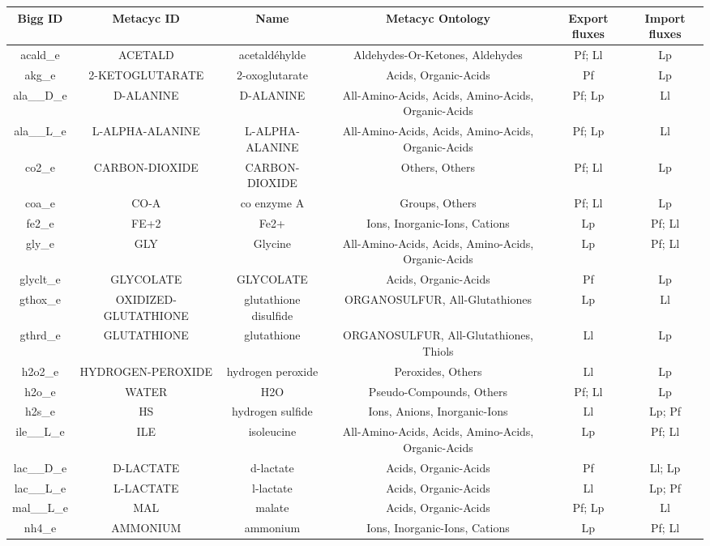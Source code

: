 \documentclass[../main.tex]{subfiles}
\begin{document}
\begin{table}[H]
\centering
\begin{adjustbox}{width=1.2\textwidth}
\begin{tabular}{|c|c|c|c|c|c|}
\hline
Bigg ID & Metacyc ID & Name & Metacyc Ontology & Export fluxes & Import fluxes\\
\hline
acald\_e	& ACETALD &	acetaldéhylde & Aldehydes-Or-Ketones, Aldehydes	& Pf; Ll &	Lp \\
akg\_e &	2-KETOGLUTARATE	& 2-oxoglutarate &	Acids, Organic-Acids	& Pf &	Lp \\
ala\_\_D\_e &	D-ALANINE &	D-ALANINE &	All-Amino-Acids, Acids, Amino-Acids, Organic-Acids	& Pf; Lp &	Ll \\
ala\_\_L\_e	& L-ALPHA-ALANINE &	L-ALPHA-ALANINE &	All-Amino-Acids, Acids, Amino-Acids, Organic-Acids	& Pf; Lp	& Ll \\
co2\_e &	CARBON-DIOXIDE	& CARBON-DIOXIDE	& Others, Others	& Pf; Ll &	Lp \\
coa\_e &	CO-A &	co enzyme A &	Groups, Others	& Pf; Ll	& Lp \\
fe2\_e	& FE+2	& Fe2+&	Ions, Inorganic-Ions, Cations &	Lp	& Pf; Ll \\
gly\_e	& GLY	& Glycine	& All-Amino-Acids, Acids, Amino-Acids, Organic-Acids &	Lp &	Pf; Ll \\
glyclt\_e &	GLYCOLATE &	GLYCOLATE	& Acids, Organic-Acids	& Pf &	Lp \\
gthox\_e &	OXIDIZED-GLUTATHIONE &	glutathione disulfide	& ORGANOSULFUR, All-Glutathiones &	Lp &	Ll \\
gthrd\_e	& GLUTATHIONE &	glutathione	& ORGANOSULFUR, All-Glutathiones, Thiols	& Ll	& Lp \\
h2o2\_e &	HYDROGEN-PEROXIDE &	hydrogen peroxide &	Peroxides, Others	& Ll &	Lp \\
h2o\_e	& WATER	& H2O	& Pseudo-Compounds, Others &	Pf; Ll	& Lp \\
h2s\_e	& HS	& hydrogen sulfide &	Ions, Anions, Inorganic-Ions	& Ll	& Lp; Pf \\
ile\_\_L\_e &	ILE &	isoleucine &	All-Amino-Acids, Acids, Amino-Acids, Organic-Acids &	Lp	& Pf; Ll \\
lac\_\_D\_e &	D-LACTATE &	d-lactate &	Acids, Organic-Acids	& Pf &	Ll; Lp \\
lac\_\_L\_e &	L-LACTATE &	l-lactate &	Acids, Organic-Acids &	Ll	& Lp; Pf \\
mal\_\_L\_e &	MAL	& malate &	Acids, Organic-Acids	& Pf; Lp &	Ll \\
nh4\_e &	AMMONIUM &	ammonium &	Ions, Inorganic-Ions, Cations	& Lp	& Pf; Ll \\

\end{tabular}
\end{adjustbox}
\end{table}
\end{document}
